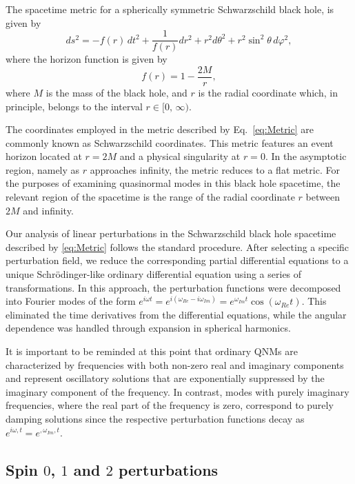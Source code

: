 The spacetime metric for a spherically symmetric Schwarzschild black hole, is given by \cite{Schwarzschild:1916uq}
%
\begin{equation}\label{eq:Metric}
  ds^2=-f(r)\,dt^2+\frac{1}{f(r)}dr^2+r^2d\theta^2+
  r^2\sin^2{\theta}\,d\varphi^2,
\end{equation}
%
where the horizon function is given by
%
\begin{equation}\label{EqHoriFuncHayward}
  f(r)=1-\frac{2M}{r},
\end{equation}
%
where $M$ is the mass of the black hole, and $r$ is the radial coordinate which, in principle, belongs to the interval $r\in [0,\, \infty)$.

The coordinates employed in the metric described by Eq.~\eqref{eq:Metric} are commonly known as Schwarzschild coordinates. This metric features an event horizon located at $r=2M$ and a physical singularity at $r=0$. In the asymptotic region, namely as $r$ approaches infinity, the metric reduces to a flat metric. For the purposes of examining quasinormal modes in this black hole spacetime, the relevant region of the spacetime is the range of the radial coordinate $r$ between $2M$ and infinity.

Our analysis of linear perturbations in the Schwarzschild black hole spacetime described by \eqref{eq:Metric} follows the standard procedure. After selecting a specific perturbation field, we reduce the corresponding partial differential equations to a unique Schrödinger-like ordinary differential equation using a series of transformations. In this approach, the perturbation functions were decomposed into Fourier modes of the form $e^{i\omega t}=e^{i(\omega_{Re}-i \omega_{Im})}=e^{\omega_{Im} t}\cos{\left(\omega_{Re} t\right)}$. This eliminated the time derivatives from the differential equations, while the angular dependence was handled through expansion in spherical harmonics.

It is important to be reminded at this point that ordinary QNMs are characterized by frequencies with both non-zero real and imaginary components and represent oscillatory solutions that are exponentially suppressed by the imaginary component of the frequency. In contrast, modes with purely imaginary frequencies, where the real part of the frequency is zero, correspond to purely damping solutions since the respective perturbation functions decay as $ e^{i\omega,t}=e^{,\omega_{Im},t}$.

\subsection{Spin $0$, $1$ and $2$ perturbations}

